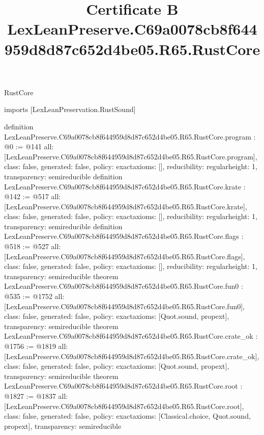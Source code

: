 \begin{lexlean}{RustCore}
\title{Certificate B LexLeanPreserve.C69a0078cb8f644959d8d87c652d4be05.R65.RustCore}
\begin{coremodule}
imports [LexLeanPreservation.RustSound]

definition LexLeanPreserve.C69a0078cb8f644959d8d87c652d4be05.R65.RustCore.program : @0 := @141 {
  all: [LexLeanPreserve.C69a0078cb8f644959d8d87c652d4be05.R65.RustCore.program],
  class: false,
  generated: false,
  policy: exact{axioms: []},
  reducibility: regular{height: 1},
  transparency: semireducible
}
definition LexLeanPreserve.C69a0078cb8f644959d8d87c652d4be05.R65.RustCore.krate : @142 := @517 {
  all: [LexLeanPreserve.C69a0078cb8f644959d8d87c652d4be05.R65.RustCore.krate],
  class: false,
  generated: false,
  policy: exact{axioms: []},
  reducibility: regular{height: 1},
  transparency: semireducible
}
definition LexLeanPreserve.C69a0078cb8f644959d8d87c652d4be05.R65.RustCore.flags : @518 := @527 {
  all: [LexLeanPreserve.C69a0078cb8f644959d8d87c652d4be05.R65.RustCore.flags],
  class: false,
  generated: false,
  policy: exact{axioms: []},
  reducibility: regular{height: 1},
  transparency: semireducible
}
theorem LexLeanPreserve.C69a0078cb8f644959d8d87c652d4be05.R65.RustCore.fun0 : @535 := @1752 {
  all: [LexLeanPreserve.C69a0078cb8f644959d8d87c652d4be05.R65.RustCore.fun0],
  class: false,
  generated: false,
  policy: exact{axioms: [Quot.sound, propext]},
  transparency: semireducible
}
theorem LexLeanPreserve.C69a0078cb8f644959d8d87c652d4be05.R65.RustCore.crate_ok : @1756 := @1819 {
  all: [LexLeanPreserve.C69a0078cb8f644959d8d87c652d4be05.R65.RustCore.crate_ok],
  class: false,
  generated: false,
  policy: exact{axioms: [Quot.sound, propext]},
  transparency: semireducible
}
theorem LexLeanPreserve.C69a0078cb8f644959d8d87c652d4be05.R65.RustCore.root : @1827 := @1837 {
  all: [LexLeanPreserve.C69a0078cb8f644959d8d87c652d4be05.R65.RustCore.root],
  class: false,
  generated: false,
  policy: exact{axioms: [Classical.choice, Quot.sound, propext]},
  transparency: semireducible
}


\end{coremodule}
\end{lexlean}

